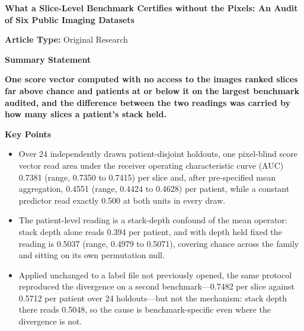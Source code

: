 \documentclass[11pt,letterpaper]{article}
\begin{document}

{\large\bfseries What a Slice-Level Benchmark Certifies without the Pixels:
An Audit of Six Public Imaging Datasets\par}

\vspace{0.8em}

\textbf{Article Type:} Original Research

\vspace{0.4em}

\textbf{Summary Statement}

\textbf{One score vector computed with no access to the images ranked slices far
above chance and patients at or below it on the largest benchmark audited, and
the difference between the two readings was carried by how many slices a
patient's stack held.}

\vspace{0.4em}

\textbf{Key Points}

\begin{itemize}\setlength{\itemsep}{0.1em}
\item Over 24 independently drawn patient-disjoint holdouts, one pixel-blind
score vector read area under the receiver operating characteristic curve (AUC)
0.7381 (range, 0.7350 to 0.7415) per slice and, after pre-specified mean
aggregation, 0.4551 (range, 0.4424 to 0.4628) per patient, while a constant
predictor read exactly 0.500 at both units in every draw.
\item The patient-level reading is a stack-depth confound of the mean operator:
stack depth alone reads 0.394 per patient, and with depth held fixed the reading
is 0.5037 (range, 0.4979 to 0.5071), covering chance across the family and
sitting on its own permutation null.
\item Applied unchanged to a label file not previously opened, the same protocol
reproduced the divergence on a second benchmark---0.7482 per slice against 0.5712
per patient over 24 holdouts---but not the mechanism: stack depth there reads
0.5048, so the cause is benchmark-specific even where the divergence is not.
\end{itemize}

\vspace{0.4em}
\end{document}
